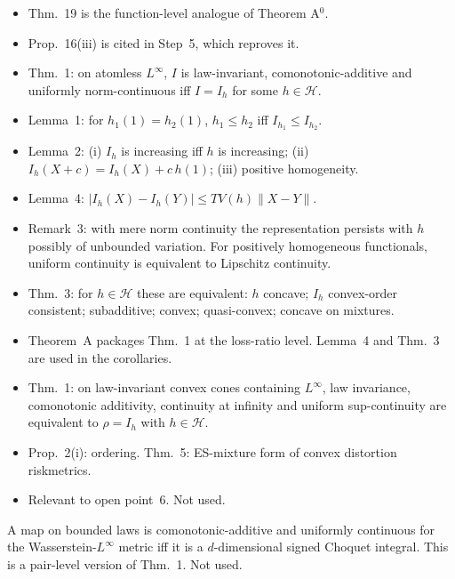 \begin{description}
\begin{itemize}
  \item Thm.~19 is the function-level analogue of Theorem A$^0$.
  \item Prop.~16(iii) is cited in Step~5, which reproves it.
  \end{itemize}
\item[Wang, Wei and Willmot (2020). {[read]}]
  \begin{itemize}
  \item Thm.~1: on atomless $L^\infty$, $I$ is law-invariant, comonotonic-additive and uniformly norm-continuous iff $I=I_h$ for some $h\in\mathcal H$.
  \item Lemma~1: for $h_1(1)=h_2(1)$, $h_1\le h_2$ iff $I_{h_1}\le I_{h_2}$.
  \item Lemma~2: (i) $I_h$ is increasing iff $h$ is increasing; (ii) $I_h(X+c)=I_h(X)+c\,h(1)$; (iii) positive homogeneity.
  \item Lemma~4: $|I_h(X)-I_h(Y)|\le TV(h)\|X-Y\|$.
  \item Remark~3: with mere norm continuity the representation persists with $h$ possibly of unbounded variation. For positively homogeneous functionals, uniform continuity is equivalent to Lipschitz continuity.
  \item Thm.~3: for $h\in\mathcal H$ these are equivalent: $h$ concave; $I_h$ convex-order consistent; subadditive; convex; quasi-convex; concave on mixtures.
  \item Theorem~A packages Thm.~1 at the loss-ratio level. Lemma~4 and Thm.~3 are used in the corollaries.
  \end{itemize}
\item[Wang, Wang and Wei (2020). {[read]}]
  \begin{itemize}
  \item Thm.~1: on law-invariant convex cones containing $L^\infty$, law invariance, comonotonic additivity, continuity at infinity and uniform sup-continuity are equivalent to $\rho=I_h$ with $h\in\mathcal H$.
  \item Prop.~2(i): ordering. Thm.~5: ES-mixture form of convex distortion riskmetrics.
  \item Relevant to open point~6. Not used.
  \end{itemize}
\item[Wang and Wei (2020), Prop.~5.2. {[read]}] A map on bounded laws is comonotonic-additive and uniformly continuous for the Wasserstein-$L^\infty$ metric iff it is a $d$-dimensional signed Choquet integral. This is a pair-level version of Thm.~1. Not used.
\end{description}

